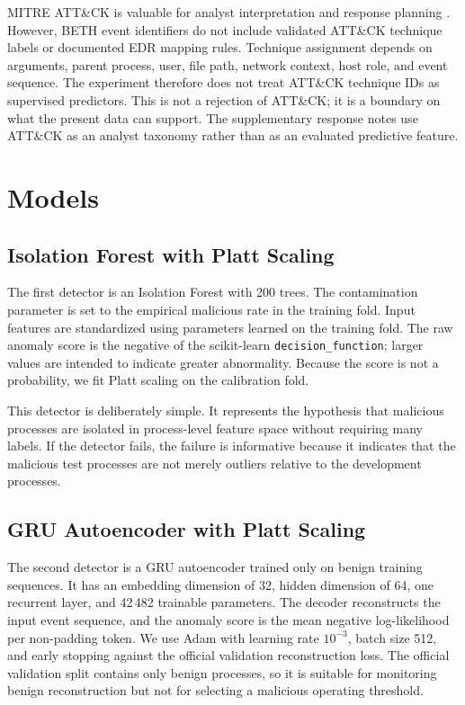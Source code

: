 \documentclass[10pt,journal,compsoc]{IEEEtran}
\begin{document}
MITRE ATT\&CK is valuable for analyst interpretation and response planning \cite{mitre2023,strom2018}. However, BETH event identifiers do not include validated ATT\&CK technique labels or documented EDR mapping rules. Technique assignment depends on arguments, parent process, user, file path, network context, host role, and event sequence. The experiment therefore does not treat ATT\&CK technique IDs as supervised predictors. This is not a rejection of ATT\&CK; it is a boundary on what the present data can support. The supplementary response notes use ATT\&CK as an analyst taxonomy rather than as an evaluated predictive feature.

\section{Models}
\label{sec:models}

\subsection{Isolation Forest with Platt Scaling}

The first detector is an Isolation Forest \cite{liu2008} with 200 trees. The contamination parameter is set to the empirical malicious rate in the training fold. Input features are standardized using parameters learned on the training fold. The raw anomaly score is the negative of the scikit-learn \texttt{decision\_function}; larger values are intended to indicate greater abnormality. Because the score is not a probability, we fit Platt scaling on the calibration fold.

This detector is deliberately simple. It represents the hypothesis that malicious processes are isolated in process-level feature space without requiring many labels. If the detector fails, the failure is informative because it indicates that the malicious test processes are not merely outliers relative to the development processes.

\subsection{GRU Autoencoder with Platt Scaling}

The second detector is a GRU autoencoder trained only on benign training sequences. It has an embedding dimension of 32, hidden dimension of 64, one recurrent layer, and 42\,482 trainable parameters. The decoder reconstructs the input event sequence, and the anomaly score is the mean negative log-likelihood per non-padding token. We use Adam with learning rate $10^{-3}$, batch size 512, and early stopping against the official validation reconstruction loss. The official validation split contains only benign processes, so it is suitable for monitoring benign reconstruction but not for selecting a malicious operating threshold.
\end{document}
